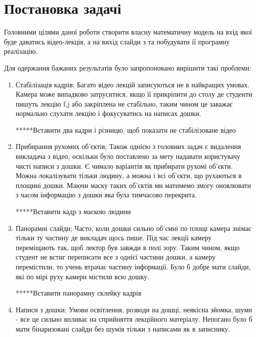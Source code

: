 \section{Постановка задачі}

Головними цілями даної роботи створити власну математичну
модель на вхід якої буде даватись відео-лекція, а на вихід
слайди з та побудувати її програмну реалізацію.

Для одержання бажаних результатів було запропоновано
вирішити такі проблеми:
\begin{enumerate}
    \item Стабілізація кадрів;
          Багато відео лекцій записуються не в найкращих умовах. 
          Камера може випадково затруситися, якщо її прикріпити до столу
          де студенти пишуть лекцію f,j або закріплена не стабільно, таким чином 
          це заважає нормально слухати лекцію і фокусуватись на написах дошки.

          *****Вставити  два кадри і різницю, щоб показати не стабілізоване відео
    
    \item Прибирання рухомих об'єктів;
          Також однією з головних задач є видалення викладача з відео, оскільки
          було поставлено за мету надавати користувачу чисті написи з дошки.
          Є чимало варіантів як прибирати рухомі об'єкти. Можна локалізувати тільки 
          людину, а можна і всі об'єкти, що рухаються в площині дошки. Маючи 
          маску таких об'єктів ми матимемо змогу оновлювати з часом інформацію з дошки
          яка була тимчасово перекрита.

          *****Вставити кадр з маскою людини

    \item Панорамні слайди;
          Часто, коли дошки сильно об'ємні по площі камера знімає тільки ту частину де 
          викладач щось пише. Під час лекції камеру переміщають так, щоб лектор був завжди 
          в полі зору. Таким чином, якщо студент не встиг переписати все з однієї частини 
          дошки, а камеру перемістили, то учень втрачає частину інформації. Було б добре 
          мати слайди, які по мірі руху камери містили всю дошку.
          
          *****Вставити панорамну склейку кадрів

    \item Написи з дошки;
          Умови освітлення, розводи на дошці, неякісна зйомка, шуми - все це сильно впливає 
          на сприйняття лекційного матеріалу. Непогано було б мати бінаризовані слайди без 
          шумів тільки з написами як в записнику.

\end{enumerate}



